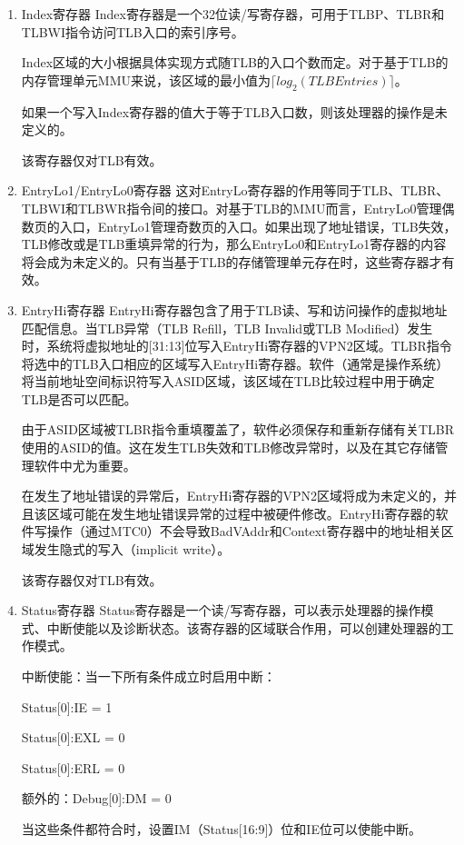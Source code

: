 \begin{enumerate}[(1)]
\item Index寄存器
Index寄存器是一个32位读/写寄存器，可用于TLBP、TLBR和TLBWI指令访问TLB入口的索引序号。

Index区域的大小根据具体实现方式随TLB的入口个数而定。对于基于TLB的内存管理单元MMU来说，该区域的最小值为$\lceil log_{2}(TLBEntries)\rceil$。

如果一个写入Index寄存器的值大于等于TLB入口数，则该处理器的操作是未定义的。

该寄存器仅对TLB有效。

\item EntryLo1/EntryLo0寄存器
这对EntryLo寄存器的作用等同于TLB、TLBR、TLBWI和TLBWR指令间的接口。对基于TLB的MMU而言，EntryLo0管理偶数页的入口，EntryLo1管理奇数页的入口。如果出现了地址错误，TLB失效，TLB修改或是TLB重填异常的行为，那么EntryLo0和EntryLo1寄存器的内容将会成为未定义的。只有当基于TLB的存储管理单元存在时，这些寄存器才有效。

\item EntryHi寄存器
EntryHi寄存器包含了用于TLB读、写和访问操作的虚拟地址匹配信息。当TLB异常（TLB Refill，TLB Invalid或TLB Modified）发生时，系统将虚拟地址的[31:13]位写入EntryHi寄存器的VPN2区域。TLBR指令将选中的TLB入口相应的区域写入EntryHi寄存器。软件（通常是操作系统）将当前地址空间标识符写入ASID区域，该区域在TLB比较过程中用于确定TLB是否可以匹配。

由于ASID区域被TLBR指令重填覆盖了，软件必须保存和重新存储有关TLBR使用的ASID的值。这在发生TLB失效和TLB修改异常时，以及在其它存储管理软件中尤为重要。

在发生了地址错误的异常后，EntryHi寄存器的VPN2区域将成为未定义的，并且该区域可能在发生地址错误异常的过程中被硬件修改。EntryHi寄存器的软件写操作（通过MTC0）不会导致BadVAddr和Context寄存器中的地址相关区域发生隐式的写入（implicit write）。

该寄存器仅对TLB有效。

\item Status寄存器
Status寄存器是一个读/写寄存器，可以表示处理器的操作模式、中断使能以及诊断状态。该寄存器的区域联合作用，可以创建处理器的工作模式。

中断使能：当一下所有条件成立时启用中断：

\quad Status[0]:IE = 1

\quad Status[0]:EXL = 0

\quad Status[0]:ERL = 0

\quad 额外的：Debug[0]:DM = 0

当这些条件都符合时，设置IM（Status[16:9]）位和IE位可以使能中断。


\end{enumerate}
